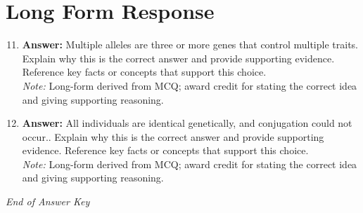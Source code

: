 \documentclass[12pt]{article}
\begin{document}
\section*{Long Form Response}
\begin{enumerate}[label=\arabic*.]
\setcounter{enumi}{10}
\item \textbf{Answer:} Multiple alleles are three or more genes that control multiple traits. Explain why this is the correct answer and provide supporting evidence. Reference key facts or concepts that support this choice.
\\ \textit{Note:} Long-form derived from MCQ; award credit for stating the correct idea and giving supporting reasoning.
\item \textbf{Answer:} All individuals are identical genetically, and conjugation could not occur.. Explain why this is the correct answer and provide supporting evidence. Reference key facts or concepts that support this choice.
\\ \textit{Note:} Long-form derived from MCQ; award credit for stating the correct idea and giving supporting reasoning.
\end{enumerate}

\vfill
\noindent\textit{End of Answer Key}
\end{document}

